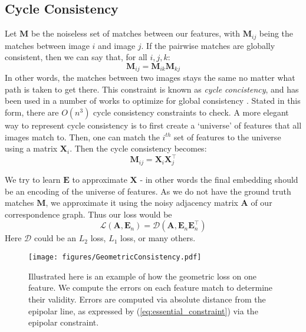 \documentclass[10pt,twocolumn,letterpaper]{article}
\newcommand{\mat}[1]{\mathbf{#1}}
\begin{document}
\subsection{Cycle Consistency}
Let $\mat{M}$ be the noiseless set of matches between our features, with $\mat{M}_{ij}$ being the matches between image $i$ and image $j$.
If the pairwise matches are globally consistent, then we can say that, for all $i, j, k$:
\begin{equation}
\mat{M}_{ij} = \mat{M}_{ik} \mat{M}_{kj}
\label{eq:cycconsist1}
\end{equation}
In other words, the matches between two images stays the same no matter what path is taken to get there. 
This constraint is known as \textit{cycle concistency}, and has been used in a number of works to optimize for global consistency \cite{zhou2015multi, wang2017multi, leonardos2016distributed}.
Stated in this form, there are $O(n^3)$ cycle consistency constraints to check.
A more elegant way to represent cycle consistency is to first create a `universe' of features that all images match to.
Then, one can match the $i^{th}$ set of features to the universe using a matrix $\mat{X}_i$.
Then the cycle consistency becomes:
\begin{equation}
\mat{M}_{ij} = \mat{X}_{i}\mat{X}_{j}^\top
\label{eq:cycconsist2}
\end{equation}

We try to learn $\mat{E}$ to approximate $\mat{X}$ - in other words the final embedding should be an encoding of the universe of features. As we do not have the ground truth matches $\mat{M}$, we approximate it using the noisy adjacency matrix $\mat{A}$ of our correspondence graph. Thus our loss would be 
\begin{equation}
\mathcal{L}(\mat{A}, \mat{E}_n) = \mathcal{D}(\mat{A}, \mat{E}_n\mat{E}_n^\top)
\end{equation}
Here $\mathcal{D}$ could be an $L_2$ loss, $L_1$ loss, or many others.

\begin{figure}[t]
\begin{center}
  \texttt{[image: figures/GeometricConsistency.pdf]}
\end{center}
  \caption{
    Illustrated here is an example of how the geometric loss on one feature.  
    We compute the errors on each feature match to determine their validity.
    Errors are computed via absolute distance from the epipolar line, as expressed by (\ref{eq:essential_constraint}) via the epipolar constraint.
  }
\label{fig:cycconsistex}
\label{fig:onecol}
\end{figure}
\end{document}
